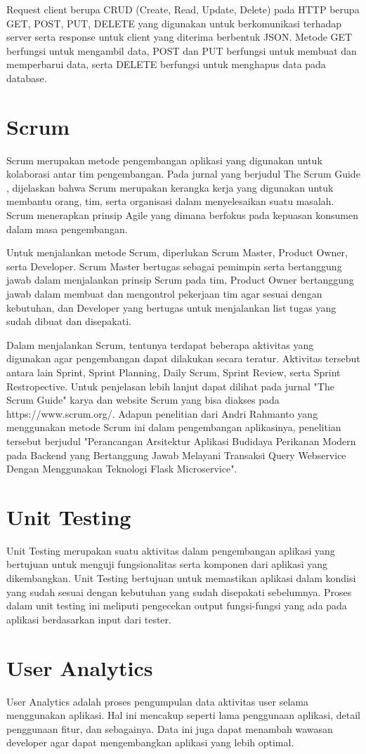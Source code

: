 Request client berupa CRUD (Create, Read, Update, Delete) pada HTTP berupa GET, POST, PUT, DELETE yang digunakan untuk berkomunikasi terhadap server serta response untuk client yang diterima berbentuk JSON. Metode GET berfungsi untuk mengambil data, POST dan PUT berfungsi untuk membuat dan memperbarui data, serta DELETE berfungsi untuk menghapus data pada database.
\section{Scrum}

Scrum merupakan metode pengembangan aplikasi yang digunakan untuk kolaborasi antar tim pengembangan. Pada jurnal yang berjudul The Scrum Guide \citep{scrum}, dijelaskan bahwa Scrum merupakan kerangka kerja yang digunakan untuk membantu orang, tim, serta organisasi dalam menyelesaikan suatu masalah. Scrum menerapkan prinsip Agile yang dimana berfokus pada kepuasan konsumen dalam masa pengembangan.

Untuk menjalankan metode Scrum, diperlukan Scrum Master, Product Owner, serta Developer. Scrum Master bertugas sebagai pemimpin serta bertanggung jawab dalam menjalankan prinsip Scrum pada tim, Product Owner bertanggung jawab dalam membuat dan mengontrol pekerjaan tim agar sesuai dengan kebutuhan, dan Developer yang bertugas untuk menjalankan list tugas yang sudah dibuat dan disepakati.

Dalam menjalankan Scrum, tentunya terdapat beberapa aktivitas yang digunakan agar pengembangan dapat dilakukan secara teratur. Aktivitas tersebut antara lain Sprint, Sprint Planning, Daily Scrum, Sprint Review, serta Sprint Restropective. Untuk penjelasan lebih lanjut dapat dilihat pada jurnal "The Scrum Guide" karya \citep{scrum} dan website Scrum yang bisa diakses pada https://www.scrum.org/. Adapun penelitian dari Andri Rahmanto yang menggunakan metode Scrum ini dalam pengembangan aplikasinya, penelitian tersebut berjudul "Perancangan Arsitektur Aplikasi Budidaya Perikanan Modern pada Backend yang Bertanggung Jawab Melayani Transaksi Query Webservice Dengan Menggunakan Teknologi Flask Microservice".
\section{Unit Testing}

Unit Testing merupakan suatu aktivitas dalam pengembangan aplikasi yang bertujuan untuk menguji fungsionalitas serta komponen dari aplikasi yang dikembangkan. Unit Testing bertujuan untuk memastikan aplikasi dalam kondisi yang sudah sesuai dengan kebutuhan yang sudah disepakati sebelumnya. Proses dalam unit testing ini meliputi pengecekan output fungsi-fungsi yang ada pada aplikasi berdasarkan input dari tester.

\section{User Analytics}

User Analytics adalah proses pengumpulan data aktivitas user selama menggunakan aplikasi. Hal ini mencakup seperti lama penggunaan aplikasi, detail penggunaan fitur, dan sebagainya. Data ini juga dapat menambah wawasan developer agar dapat mengembangkan aplikasi yang lebih optimal.